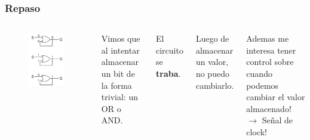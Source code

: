 \documentclass[10pt]{beamer}
\begin{document}
\begin{frame}
\frametitle{Repaso}

\begin{columns}
        \begin{figure}[h!]
            \centering
            \includegraphics[scale=0.3]{unbit.png}
        \end{figure}
        Vimos que al intentar almacenar un bit de la forma trivial: un OR o AND.

        El circuito se \textbf{traba}.

\pause
\vspace{1cm}
Luego de almacenar un valor, no puedo cambiarlo.
\vspace{1cm}
\pause

Ademas me interesa tener control sobre cuando podemos cambiar el valor almacenado!
\pause $\to$
Se\~nal de clock!

\end{columns}
\end{frame}
\end{document}
